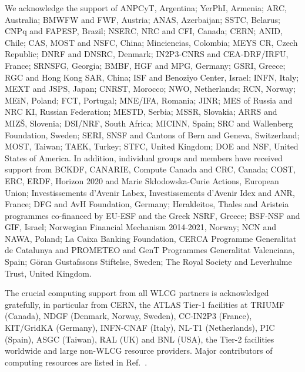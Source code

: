 \documentclass[PAPER, coverpage, atlasdraft=true, texlive=2016, UKenglish]{\ATLASLATEXPATH atlasdoc}
\begin{document}
We acknowledge the support of 
ANPCyT, Argentina; 
YerPhI, Armenia; 
ARC, Australia; 
BMWFW and FWF, Austria; 
ANAS, Azerbaijan; 
SSTC, Belarus; 
CNPq and FAPESP, Brazil; 
NSERC, NRC and CFI, Canada; 
CERN; 
ANID, Chile; 
CAS, MOST and NSFC, China; 
Minciencias, Colombia; 
MEYS CR, Czech Republic; 
DNRF and DNSRC, Denmark; 
IN2P3-CNRS and CEA-DRF/IRFU, France; 
SRNSFG, Georgia; 
BMBF, HGF and MPG, Germany; 
GSRI, Greece; 
RGC and Hong Kong SAR, China; 
ISF and Benoziyo Center, Israel; 
INFN, Italy; 
MEXT and JSPS, Japan; 
CNRST, Morocco; 
NWO, Netherlands; 
RCN, Norway; 
MEiN, Poland; 
FCT, Portugal; 
MNE/IFA, Romania; 
JINR; 
MES of Russia and NRC KI, Russian Federation; 
MESTD, Serbia; 
MSSR, Slovakia; 
ARRS and MIZ\v{S}, Slovenia; 
DSI/NRF, South Africa; 
MICINN, Spain; 
SRC and Wallenberg Foundation, Sweden; 
SERI, SNSF and Cantons of Bern and Geneva, Switzerland; 
MOST, Taiwan; 
TAEK, Turkey; 
STFC, United Kingdom; 
DOE and NSF, United States of America. 
In addition, individual groups and members have received support from 
BCKDF, CANARIE, Compute Canada and CRC, Canada; 
COST, ERC, ERDF, Horizon 2020 and Marie Sk{\l}odowska-Curie Actions, European Union; 
Investissements d'Avenir Labex, Investissements d'Avenir Idex and ANR, France; 
DFG and AvH Foundation, Germany; 
Herakleitos, Thales and Aristeia programmes co-financed by EU-ESF and the Greek NSRF, Greece; 
BSF-NSF and GIF, Israel; 
Norwegian Financial Mechanism 2014-2021, Norway; 
NCN and NAWA, Poland; 
La Caixa Banking Foundation, CERCA Programme Generalitat de Catalunya and PROMETEO and GenT Programmes Generalitat Valenciana, Spain; 
G\"{o}ran Gustafssons Stiftelse, Sweden; 
The Royal Society and Leverhulme Trust, United Kingdom.

The crucial computing support from all WLCG partners is acknowledged gratefully, in particular from CERN, the ATLAS Tier-1 facilities at TRIUMF (Canada), NDGF (Denmark, Norway, Sweden), CC-IN2P3 (France), KIT/GridKA (Germany), INFN-CNAF (Italy), NL-T1 (Netherlands), PIC (Spain), ASGC (Taiwan), RAL (UK) and BNL (USA), the Tier-2 facilities worldwide and large non-WLCG resource providers. Major contributors of computing resources are listed in Ref.~\cite{ATL-SOFT-PUB-2021-003}.


\end{document}
